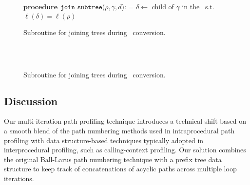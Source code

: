 \ifdefined\noauthorea
\begin{figure}[ht!]
\IncMargin{2em}
\begin{algorithm}[H]
\DontPrintSemicolon
\LinesNumbered
\SetAlgoNoLine
\SetNlSkip{1em}
\Indm\Indmm
\hrulefill\\
$\mathbf{procedure} \> \> \texttt{join\_subtree}$($\rho,\gamma,d$):\;
\vspace{1mm}
\everypar={\nl}
\Indp\Indpp
$\delta\gets$ child of $\gamma$ in the \kipf\ s.t. $\ell(\delta)=\ell(\rho)$\;
\vspace{-2mm}
\Indm\Indmm
\nonl\hrulefill\vspace{1mm}\\
\DecMargin{1.0em}
\caption{\label{alg:kblpp-join-subtrees} Subroutine for joining trees during \ksf\ conversion.}
\DecMargin{1.0em}
\end{algorithm}
\end{figure}

\else
\begin{figure}[ht]
\caption{\label{alg:kblpp-join-subtrees} Subroutine for joining trees during \ksf\ conversion.}
\begin{small}
\begin{minipage}{0.9\textwidth}
\hrulefill\\
\algmissing\

\vspace{-1mm}
\hrulefill
\vspace{-2mm}
\end{minipage}
\end{small}
\end{figure}
\fi


\subsection{Discussion}

Our multi-iteration path profiling technique introduces a technical shift based on a smooth blend of the path numbering methods used in intraprocedural path profiling with data structure-based techniques typically adopted in interprocedural profiling, such as calling-context profiling. Our solution combines the original Ball-Larus path numbering technique with a prefix tree data structure to keep track of concatenations of acyclic paths across multiple loop iterations.

